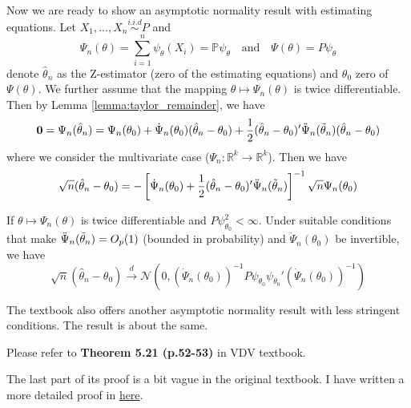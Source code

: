 \documentclass{article}
\begin{document}
Now we are ready to show an asymptotic normality result with estimating equations. Let $X_1, ..., X_n \overset{i.i.d}{\sim} P$ and 
\begin{equation}
    \Psi_n(\theta) = \sum_{i=1}^{n} \psi_\theta(X_i) = \mathbb{P} \psi_\theta \quad \text{and} \quad \Psi(\theta) = P \psi_\theta
\end{equation}
denote $\hat \theta_n$ as the Z-estimator (zero of the estimating equations) and $\theta_0$ zero of $\Psi(\theta)$. 
We further assume that the mapping $\theta \mapsto \Psi_n(\theta)$ is twice differentiable. Then by Lemma \ref{lemma:taylor_remainder}, we have
\begin{equation}
    \mathbf{0} = \Psi_n(\hat \theta_n) = \Psi_n(\theta_0) + \dot{\Psi}_n(\theta_0)(\hat \theta_n - \theta_0) + \frac{1}{2}(\hat \theta_n - \theta_0)'\ddot{\Psi}_n(\Tilde{\theta}_n)(\hat \theta_n - \theta_0)
\end{equation}
where we consider the multivariate case ($\Psi_n: \mathbb{R}^k \to \mathbb{R}^k$). Then we have
\begin{equation}
    \sqrt{n}(\hat \theta_n - \theta_0) = -\left[ \dot{\Psi}_n(\theta_0) + \frac{1}{2}(\hat \theta_n - \theta_0)' \ddot{\Psi}_n(\Tilde{\theta}_n)\right]^{-1} 
    \sqrt{n}\Psi_n(\theta_0)
\end{equation}
\begin{theorem}[Z-estimator AN I] 
    If $\theta \mapsto \Psi_n(\theta)$ is twice differentiable and $P \psi_{\theta_0}^2 < \infty$. Under suitable conditions that make 
    $\ddot{\Psi}_n(\Tilde{\theta}_n) = O_p(1)$ (bounded in probability) and $\dot{\Psi}_n(\theta_0)$ be invertible, we have
    \begin{equation}
        \sqrt{n}(\hat \theta_n - \theta_0) \overset{d}{\rightarrow} \mathcal{N}\left(0, 
        (\dot{\Psi}_n(\theta_0))^{-1}P\psi_{\theta_0}\psi_{\theta_0}'(\dot{\Psi}_n(\theta_0))^{-1}\right)
    \end{equation}
\end{theorem}
The textbook also offers another asymptotic normality result with less stringent conditions. The result is about the same.
\begin{theorem}[Z-estimator AN II]
    \hfill \newline
    Please refer to \textbf{Theorem 5.21 (p.52-53)} in VDV textbook.
\end{theorem}
The last part of its proof is a bit vague in the original textbook. I have written a more detailed proof in \href{https://math.stackexchange.com/a/4929317}{here}.
\end{document}
